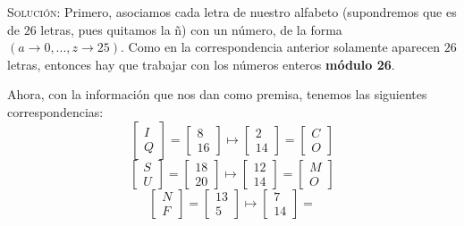 \documentclass[letterpaper,10pt]{article}
\begin{document}
\begin{enumerate}
\begin{enumerate}
        \textsc{Solución:} Primero, asociamos cada letra de nuestro alfabeto
        (supondremos que es de $26$ letras, pues quitamos la ñ) con un número,
        de la forma $(a \rightarrow 0, ..., z \rightarrow 25)$. Como en la
        correspondencia anterior solamente aparecen $26$ letras, entonces hay 
        que trabajar con los números enteros \textbf{módulo 26}.
        
        Ahora, con la información que nos dan como premisa, tenemos las 
        siguientes correspondencias:
        \begin{equation*}
            \begin{bmatrix} I  \\ Q \end{bmatrix} =
            \begin{bmatrix} 8 \\ 16 \end{bmatrix} \mapsto
            \begin{bmatrix} 2 \\ 14 \end{bmatrix} =
            \begin{bmatrix} C \\ O \end{bmatrix}
        \end{equation*}
        \begin{equation*}
            \begin{bmatrix} S  \\ U \end{bmatrix} =
            \begin{bmatrix} 18 \\ 20 \end{bmatrix} \mapsto
            \begin{bmatrix} 12 \\ 14 \end{bmatrix} =
            \begin{bmatrix} M \\ O \end{bmatrix}
        \end{equation*}
        \begin{equation*}
            \begin{bmatrix} N \\ F \end{bmatrix} =
            \begin{bmatrix} 13 \\ 5 \end{bmatrix} \mapsto
            \begin{bmatrix} 7 \\ 14 \end{bmatrix} =

\end{equation*}
\end{enumerate}
\end{enumerate}
\end{document}
